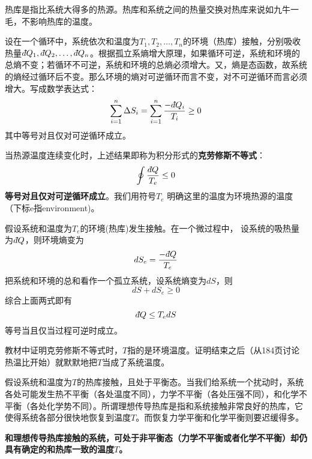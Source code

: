 \documentclass[CJK]{beamer}
\begin{document}
\begin{frame}
\bch
热库是指比系统大得多的热源。热库和系统之间的热量交换对热库来说如九牛一毛，不影响热库的温度。

\ech
\end{frame}


\begin{frame}
\bch
{\small
设在一个循环中，系统依次和温度为$T_1, T_2, \ldots, T_n$的环境（热库）接触，分别吸收热量$\dbar Q_1, \dbar Q_2, \ldots, \dbar Q_n$。根据孤立系熵增大原理，如果循环可逆，系统和环境的总熵不变；若循环不可逆，系统和环境的总熵必须增大。又，熵是态函数，故系统的熵经过循环后不变。那么环境的熵对可逆循环而言不变，对不可逆循环而言必须增大。写成数学表达式：
$$\sum_{i=1}^n \Delta S_i = \sum_{i=1}^n \frac{-\dbar Q_i}{T_i} \ge 0$$
其中等号对且仅对可逆循环成立。

当热源温度连续变化时，上述结果即称为积分形式的{\bf 克劳修斯不等式}：
{\blue $$\oint \frac{\dbar Q}{T_e} \le 0 $$}
{\bf 等号对且仅对可逆循环成立}。我们用符号$T_e$ 明确这里的温度为环境热源的温度（下标e指environment)。
}
\ech
\end{frame}


\begin{frame}
\bch
假设系统和温度为$T_e$的环境(热库)发生接触。在一个微过程中，
设系统的吸热量为$\dbar Q$，则环境熵变为
$$ dS_e = \frac{-\dbar Q}{T_e}$$
把系统和环境的总和看作一个孤立系统，设系统熵变为$dS$，则
$$dS +dS_e \ge 0$$
综合上面两式即有
{\blue $$\dbar Q \le T_e dS $$
等号当且仅当过程可逆时成立}。
\ech
\end{frame}


\begin{frame}
\bch
教材中证明克劳修斯不等式时，$T$指的是环境温度。证明结束之后（从184页讨论热温比开始）就默默地把$T$当成了系统温度。


\ech
\end{frame}

\begin{frame}
\bch
假设系统和温度为$T$的热库接触，且处于平衡态。当我们给系统一个扰动时，系统各处可能发生热不平衡（各处温度不同），力学不平衡（各处压强不同），和化学不平衡（各处化学势不同）。所谓理想传导热库是指和系统接触非常良好的热库，它使得系统各部分很快地恢复到温度$T$。而恢复力学平衡和化学平衡则要迟缓得多。

\emini
{}
{\bf 和理想传导热库接触的系统，可处于非平衡态（力学不平衡或者化学不平衡）却仍具有确定的和热库一致的温度$T$。}
\emini
\ech
\end{frame}
\end{document}
